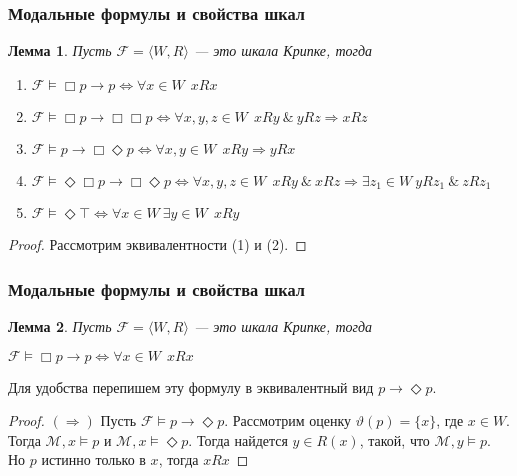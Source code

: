 \documentclass[pdf,utf8,russian,aspectratio=169]{beamer}
\newtheorem{lem}{Лемма}
\begin{document}
\begin{frame}
    \frametitle{Модальные формулы и свойства шкал}

    \begin{lem} Пусть $\mathcal{F} = \langle W, R \rangle$ --- это шкала Крипке, тогда
      \begin{enumerate}
        \item $\mathcal{F} \models \Box p \to p \Leftrightarrow \forall x \in W \:\: x R x$
        \item $\mathcal{F} \models \Box p \to \Box \Box p \Leftrightarrow \forall x, y, z \in W \:\: x R y \: \& \: y R z \Rightarrow x R z$
        \item $\mathcal{F} \models p \to \Box \Diamond p \Leftrightarrow \forall x, y \in W \:\: x R y \Rightarrow y R x$
        \item $\mathcal{F} \models \Diamond \Box p \to \Box \Diamond p \Leftrightarrow
        \forall x, y, z \in W \:\: x R y \: \& \: x R z \Rightarrow \exists z_1 \in W \: y R z_1 \: \& \: z R z_1$
        \item $\mathcal{F} \models \Diamond \top \Leftrightarrow \forall x \in W \: \exists y \in W \:\: x R y$
      \end{enumerate}
    \end{lem}

    \begin{proof}
      Рассмотрим эквивалентности (1) и (2).
    \end{proof}
\end{frame}

\begin{frame}
    \frametitle{Модальные формулы и свойства шкал}
    \begin{lem} Пусть $\mathcal{F} = \langle W, R \rangle$ --- это шкала Крипке, тогда

      $\mathcal{F} \models \Box p \to p \Leftrightarrow \forall x \in W \:\: x R x$
    \end{lem}

    Для удобства перепишем эту формулу в эквивалентный вид $p \to \Diamond p$.

    \begin{proof}
      $(\Rightarrow)$ Пусть $\mathcal{F} \models p \to \Diamond p$. Рассмотрим оценку $\vartheta(p) = \{ x \}$, где $x \in W$.
      Тогда $\mathcal{M}, x \models p$ и $\mathcal{M}, x \models \Diamond p$. Тогда найдется $y \in R(x)$, такой, что $\mathcal{M}, y \models p$.
      Но $p$ истинно только в $x$, тогда $x R x$
    \end{proof}
\end{frame}
\end{document}

